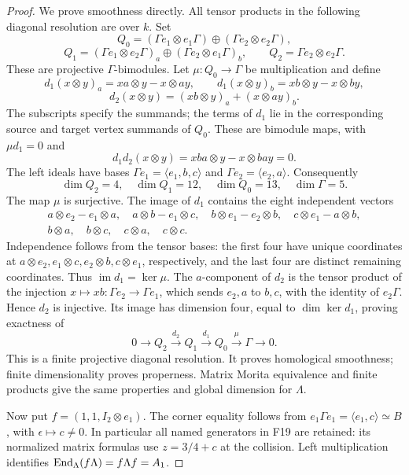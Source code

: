 \documentclass[11pt,a4paper]{article}
\newcommand{\fid}[1]{\textsf{#1}}\newcommand{\gate}[1]{\textsf{#1}}
\theoremstyle{named}\newtheorem{finding}{Finding}[section]
\theoremstyle{definition}\newtheorem{definition}[finding]{Definition}
\theoremstyle{remark}\newtheorem{remark}[finding]{Remark}
\begin{document}
\begin{proof}
We prove smoothness directly. All tensor products in the following
diagonal resolution are over $k$. Set
\[
 Q_0=(\Gamma e_1\otimes e_1\Gamma)
          \oplus(\Gamma e_2\otimes e_2\Gamma),
\]
\[
 Q_1=(\Gamma e_1\otimes e_2\Gamma)_a
          \oplus(\Gamma e_2\otimes e_1\Gamma)_b,\qquad
 Q_2=\Gamma e_2\otimes e_2\Gamma.
\]
These are projective $\Gamma$-bimodules. Let $\mu:Q_0\to\Gamma$
be multiplication and define
\[
 d_1(x\otimes y)_a=xa\otimes y-x\otimes ay,\qquad
 d_1(x\otimes y)_b=xb\otimes y-x\otimes by,
\]
\[
 d_2(x\otimes y)=(xb\otimes y)_a+(x\otimes ay)_b.
\]
The subscripts specify the summands; the terms of $d_1$ lie in
the corresponding source and target vertex summands of $Q_0$.
These are bimodule maps, with $\mu d_1=0$ and
\[
 d_1d_2(x\otimes y)=xba\otimes y-x\otimes bay=0.
\]
The left ideals have bases
$\Gamma e_1=\langle e_1,b,c\rangle$ and
$\Gamma e_2=\langle e_2,a\rangle$. Consequently
\[
 \dim Q_2=4,\quad\dim Q_1=12,\quad\dim Q_0=13,\quad
 \dim\Gamma=5.
\]
The map $\mu$ is surjective. The image of $d_1$ contains the
eight independent vectors
\[
 \begin{gathered}
 a\otimes e_2-e_1\otimes a,\quad
 a\otimes b-e_1\otimes c,\quad
 b\otimes e_1-e_2\otimes b,\quad
 c\otimes e_1-a\otimes b,\\
 b\otimes a,\quad b\otimes c,\quad
 c\otimes a,\quad c\otimes c.
 \end{gathered}
\]
Independence follows from the tensor bases: the first four have
unique coordinates at $a\otimes e_2,e_1\otimes c,e_2\otimes b,
c\otimes e_1$, respectively, and the last four are distinct
remaining coordinates. Thus $\operatorname{im}d_1=\ker\mu$.
The $a$-component of $d_2$ is the tensor product of the injection
$x\mapsto xb:\Gamma e_2\to\Gamma e_1$, which sends $e_2,a$
to $b,c$, with the identity of $e_2\Gamma$. Hence $d_2$ is
injective. Its image has dimension four, equal to
$\dim\ker d_1$, proving exactness of
\begin{equation}\label{eq:auslanderdiagonal}
 0\longrightarrow Q_2\xrightarrow{d_2}Q_1
   \xrightarrow{d_1}Q_0\xrightarrow{\mu}\Gamma
   \longrightarrow0.
\end{equation}
This is a finite projective diagonal resolution. It proves
homological smoothness; finite dimensionality proves properness.
Matrix Morita equivalence and finite products give the same
properties and global dimension for $\Lambda$.

Now put $f=(1,1,I_2\otimes e_1)$. The corner equality follows
from $e_1\Gamma e_1=\langle e_1,c\rangle\simeq B$, with
$\epsilon\mapsto c\ne0$. In particular all named generators in
\fid{F19} are retained: its normalized matrix formulas use
$z=3/4+c$ at the collision. Left multiplication identifies
$\operatorname{End}_\Lambda(f\Lambda)=f\Lambda f=A_1$.


\end{proof}
\end{document}
